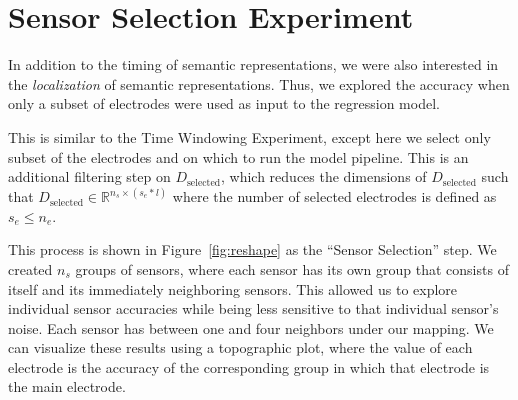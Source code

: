\section{Sensor Selection Experiment}

In addition to the timing of semantic representations, we were also interested 
in the \emph{localization} of semantic representations. Thus, we explored the 
\tvt accuracy when only a subset of electrodes were used as input to the 
regression model. 

This is similar to the Time Windowing Experiment, except here we select only 
subset of the electrodes and on which to run the model pipeline. This is an 
additional filtering step on $D_{\text{selected}}$, which reduces the 
dimensions of $D_\text{selected}$ such that $D_\text{selected} \in 
\mathbb{R}^{n_s \times (s_e * l)}$ where the number of selected electrodes is 
defined as $s_e \leq n_e$. 

This process is shown in Figure~\ref{fig:reshape} as the ``Sensor Selection'' 
step. We created $n_s$ groups of sensors, where each sensor has its own group 
that consists of itself and its immediately neighboring sensors. This allowed 
us to explore individual sensor accuracies while being less sensitive to that 
individual sensor's noise. Each sensor has between one and four neighbors under 
our mapping. We can visualize these results using a topographic plot, where the 
value of each electrode is the \tvt accuracy of the corresponding group in 
which that electrode is the main electrode.
